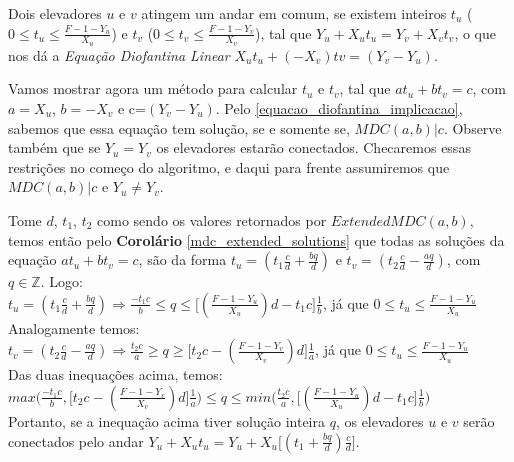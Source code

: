 Dois elevadores $u$ e $v$ atingem um andar em comum, se existem inteiros $t_u$ ($0\leq t_u\leq \frac{F-1-Y_u}{X_u}$) e $t_v$ ($0\leq t_v\leq \frac{F-1-Y_v}{X_v}$), tal que
$Y_u+X_ut_u = Y_v+X_vt_v$, o que nos dá a \textit{Equação Diofantina Linear} $X_ut_u + (-X_v)tv = (Y_v-Y_u)$.

Vamos mostrar agora um método para calcular $t_u$ e $t_v$, tal que $at_u + bt_v = c$, com $a=X_u$, $b=-X_v$ e c=$(Y_v-Y_u)$.
Pelo \autoref{equacao_diofantina_implicacao}, sabemos que essa equação tem solução, se e somente se, $MDC(a,b)|c$. Observe também que se $Y_u=Y_v$ os elevadores estarão conectados.
Checaremos essas restrições no começo do algoritmo, e daqui para frente assumiremos que $MDC(a,b)|c$ e $Y_u\neq Y_v$.

Tome $d$, $t_1$, $t_2$ como sendo os valores retornados por $ExtendedMDC(a,b)$, temos então pelo \textbf{Corolário} \autoref{mdc_extended_solutions} que todas as soluções da
equação $at_u + bt_v = c$, são da forma $t_u = (t_1\frac{c}{d} + \frac{bq}{d})$ e $t_v = (t_2\frac{c}{d} - \frac{aq}{d})$, com $q \in\mathbb{Z}$. Logo:
\\

$t_u = (t_1\frac{c}{d} + \frac{bq}{d}) \Rightarrow \frac{-t_1c}{b} \leq q \leq \big[(\frac{F-1-Y_u}{X_u})d - t_1c\big]\frac{1}{b}$, já que $0\leq t_u\leq \frac{F-1-Y_u}{X_u}$
\\

Analogamente temos:
\\

$t_v = (t_2\frac{c}{d} - \frac{aq}{d}) \Rightarrow \frac{t_2c}{a} \geq q \geq \big[t_2c - (\frac{F-1-Y_v}{X_v})d\big]\frac{1}{a}$, já que $0\leq t_u\leq \frac{F-1-Y_u}{X_u}$
\\

Das duas inequações acima, temos:
\\

$max\Big(\frac{-t_1c}{b}, \big[t_2c - (\frac{F-1-Y_v}{X_v})d\big]\frac{1}{a} \Big) \leq q \leq min\Big(\frac{t_2c}{a}, \big[(\frac{F-1-Y_u}{X_u})d - t_1c\big]\frac{1}{b}  \Big)$
\\

Portanto, se a inequação acima tiver solução inteira $q$, os elevadores $u$ e $v$ serão conectados pelo andar $Y_u+X_ut_u = Y_u+X_u\big[(t_1 + \frac{bq}{d})\frac{c}{d}\big]$.
\clearpage

